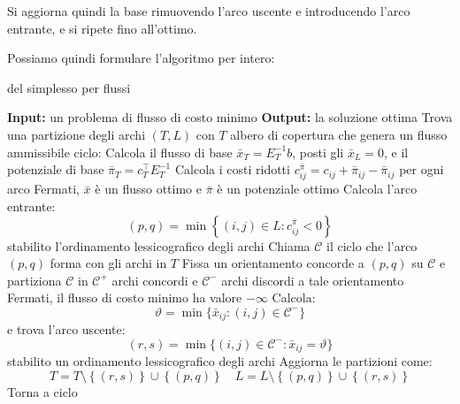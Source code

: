 \documentclass[a4paper,11pt]{article}
\begin{document}
Si aggiorna quindi la base rimuovendo l'arco uscente e introducendo l'arco entrante, e si ripete fino all'ottimo.

Possiamo quindi formulare l'algoritmo per intero:

\begin{algorithm}[H]
\caption{del simplesso per flussi}
\begin{algorithmic}
	\STATE \textbf{Input:} un problema di flusso di costo minimo 
	\STATE \textbf{Output:} la soluzione ottima 
	\STATE Trova una partizione degli archi $(T,L)$ con $T$ albero di copertura che genera un flusso ammissibile
	\STATE \textsf{ciclo:}
	\STATE Calcola il flusso di base $\bar{x}_T = E_T^{-1} b$, posti gli $\bar{x}_L = 0$, e il potenziale di base $\bar{\pi}_T = c_T^\intercal E_T^{-1}$
	\STATE Calcola i costi ridotti $c_{ij}^{\bar{\pi}} = c_{ij} + \bar{\pi}_{ij} - \bar{\pi}_{ij}$ per ogni arco
	\STATE Fermati, $\bar{x}$ è un flusso ottimo e $\bar{\pi}$ è un potenziale ottimo
\ELSE
		\STATE Calcola l'arco entrante: 
		$$
		(p, q) = \min \left\{ (i, j) \in L : c_{ij}^{\bar{\pi}} < 0 \right\}
		$$
		stabilito l'ordinamento lessicografico degli archi
		\STATE Chiama $\mathcal{C}$ il ciclo che l'arco $(p, q)$ forma con gli archi in $T$
		\STATE Fissa un orientamento concorde a $(p,q)$ su $\mathcal{C}$ e partiziona $\mathcal{C}$ in $\mathcal{C^+}$ archi concordi e $\mathcal{C^-}$ archi discordi a tale orientamento
	\ENDIF
		\STATE Fermati, il flusso di costo minimo ha valore $-\infty$ 
	\ELSE
		\STATE Calcola:
		$$
		\vartheta = \min\{ \bar{x}_{ij} : (i, j) \in \mathcal{C}^- \}
		$$
		e trova l'arco uscente: 
		$$ 
		(r, s) = \min\{ (i, j) \in \mathcal{C}^- : \bar{x}_{ij} = \vartheta \} 
		$$
		stabilito un ordinamento lessicografico degli archi
	\ENDIF
	\STATE Aggiorna le partizioni come:
	$$
	T = T \setminus \left\{ (r,s) \right\} \cup \left\{ (p, q) \right\} \quad L = L \setminus \left\{ (p, q) \right\} \cup \left\{ (r, s) \right\}
	$$
	\STATE Torna a \textsf{ciclo}
\end{algorithmic}
\end{algorithm}
\end{document}
